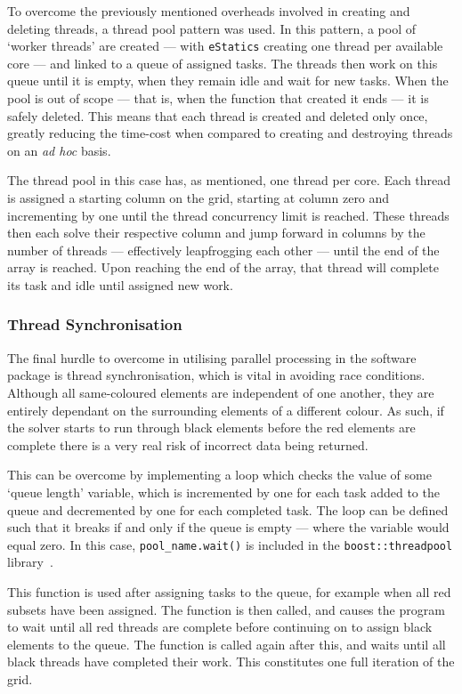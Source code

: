 			To overcome the previously mentioned overheads involved in creating and deleting threads, a thread pool pattern was used. In this pattern, a pool of `worker threads' are created --- with \lstinline|eStatics| creating one thread per available core --- and linked to a queue of assigned tasks. The threads then work on this queue until it is empty, when they remain idle and wait for new tasks. When the pool is out of scope --- that is, when the function that created it ends --- it is safely deleted. This means that each thread is created and deleted only once, greatly reducing the time-cost when compared to creating and destroying threads on an \textit{ad hoc} basis.
			
			The thread pool in this case has, as mentioned, one thread per core. Each thread is assigned a starting column on the grid, starting at column zero and incrementing by one until the thread concurrency limit is reached. These threads then each solve their respective column and jump forward in columns by the number of threads --- effectively leapfrogging each other --- until the end of the array is reached. Upon reaching the end of the array, that thread will complete its task and idle until assigned new work.
			
		\subsubsection{Thread Synchronisation}
		
			The final hurdle to overcome in utilising parallel processing in the software package is thread synchronisation, which is vital in avoiding race conditions. Although all same-coloured elements are independent of one another, they are entirely dependant on the surrounding elements of a different colour. As such, if the solver starts to run through black elements before the red elements are complete there is a very real risk of incorrect data being returned.
			
			This can be overcome by implementing a loop which checks the value of some `queue length' variable, which is incremented by one for each task added to the queue and decremented by one for each completed task. The loop can be defined such that it breaks if and only if the queue is empty --- where the variable would equal zero. In this case, \lstinline|pool_name.wait()| is included in the \lstinline|boost::threadpool| library~\cite{threadpool}.
			
			This function is used after assigning tasks to the queue, for example when all red subsets have been assigned. The function is then called, and causes the program to wait until all red threads are complete before continuing on to assign black elements to the queue. The function is called again after this, and waits until all black threads have completed their work. This constitutes one full iteration of the grid.
	

